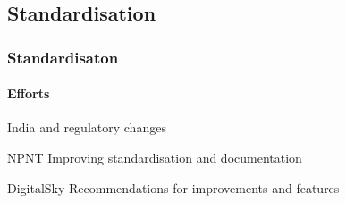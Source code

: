 \documentclass[usenames,dvipsnames,aspectratio=169,serif]{beamer}
\begin{document}
\subsection{Standardisation}
\begin{frame}[fragile] %
   \frametitle{Standardisaton}
   \framesubtitle{Efforts}
   India and regulatory changes
   \begin{block}{NPNT}
      Improving standardisation and documentation
   \end{block}

   \begin{block}{DigitalSky\texttrademark}
      Recommendations for improvements and features
   \end{block}

\end{frame}

\end{document}
